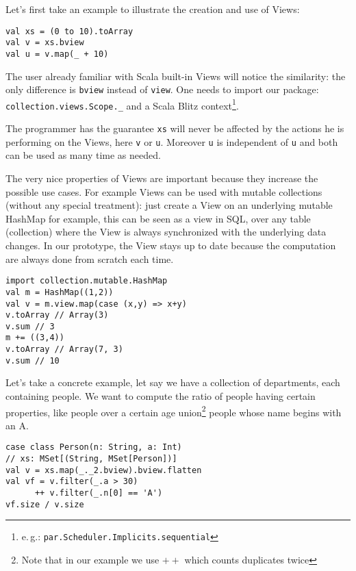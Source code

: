 \documentclass[a4paper,12pt,twocolumn]{article}
\newcommand{\eg}{e.\,g.}
\begin{document}
Let's first take an example to illustrate the creation and use of Views:

\begin{lstlisting}
val xs = (0 to 10).toArray
val v = xs.bview
val u = v.map(_ + 10)
\end{lstlisting}

The user already familiar with Scala built-in Views will notice the similarity: the only difference is \verb|bview| instead of \verb|view|.
One needs to import our package: \verb|collection.views.Scope._| and a Scala Blitz context\footnote{\eg: {\tt par.Scheduler.Implicits.sequential}}.

The programmer has the guarantee \verb|xs| will never be affected by the actions he is performing on the Views, here \verb|v| or \verb|u|.
Moreover \verb|u| is independent of \verb|u| and both can be used as many time as needed.

The very nice properties of Views are important because they increase the possible use cases.
For example Views can be used with mutable collections (without any special treatment): just create a View on an underlying mutable HashMap for example, this can be seen as a view in SQL, over any table (collection) where the View is always synchronized with the underlying data changes.
In our prototype, the View stays up to date because the computation are always done from scratch each time.

\begin{lstlisting}
import collection.mutable.HashMap
val m = HashMap((1,2))
val v = m.view.map(case (x,y) => x+y)
v.toArray // Array(3)
v.sum // 3
m += ((3,4))
v.toArray // Array(7, 3)
v.sum // 10
\end{lstlisting}

Let's take a concrete example, let say we have a collection of departments, each containing people.
We want to compute the ratio of people having certain properties, like people over a certain age union\footnote{Note that in our example we use $++$ which counts duplicates twice} people whose name begins with an A.

\begin{lstlisting}
case class Person(n: String, a: Int)
// xs: MSet[(String, MSet[Person])]
val v = xs.map(_._2.bview).bview.flatten
val vf = v.filter(_.a > 30)
      ++ v.filter(_.n[0] == 'A')
vf.size / v.size
\end{lstlisting}
\end{document}
